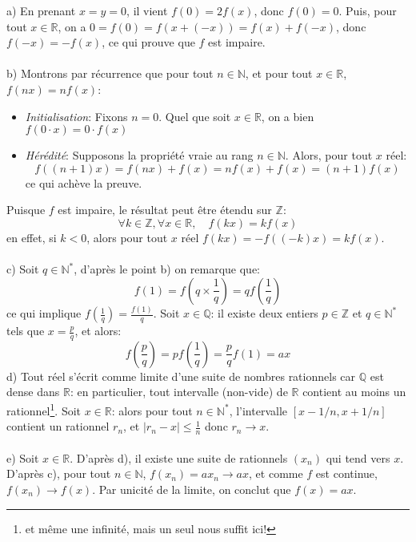 a) En prenant $x=y=0$, il vient $f(0)=2f(x)$, donc $f(0)=0$. Puis, pour tout $x\in\mathbb{R}$, on a $0=f(0)=f(x+(-x))=f(x)+f(-x)$, donc $f(-x)=-f(x)$, ce qui prouve que $f$ est impaire.\\ \\
b) Montrons par récurrence que pour tout $n\in\mathbb{N}$, et pour tout $x\in\mathbb{R}$, $f(nx)=nf(x)$:
\begin{itemize}
  \item \textit{Initialisation}: Fixons $n=0$. Quel que soit $x\in\mathbb{R}$, on a bien $f(0\cdot x)=0\cdot f(x)$
  \item \textit{Hérédité}: Supposons la propriété vraie au rang $n\in\mathbb{N}$. Alors, pour tout $x$ réel:
  \[
  f((n+1)x) = f(nx)+f(x) = nf(x)+f(x) = (n+1)f(x)
  \]
  ce qui achève la preuve.
\end{itemize}
Puisque $f$ est impaire, le résultat peut être étendu sur $\mathbb{Z}$: 
\[ \forall k\in\mathbb{Z}, \forall x \in \mathbb{R}, \quad f(kx)=kf(x) \]
en effet, si $k<0$, alors pour tout $x$ réel $f(kx)=-f((-k)x)=kf(x)$.\\ \\
c) Soit $q\in\mathbb{N}^*$, d’après le point b) on remarque que: 
  \[ f\left( 1 \right) = f\left( q \times \frac{1}{q} \right) = qf\left(\frac{1}{q}\right) \]
ce qui implique $f\left(\frac{1}{q}\right) = \frac{f(1)}{q}$. Soit $x\in\mathbb{Q}$: il existe deux entiers $p\in\mathbb{Z}$ et $q\in\mathbb{N}^*$ tels que $x=\frac{p}{q}$, et alors:
\[
f\left(\frac{p}{q}\right) = pf\left(\frac{1}{q}\right) = \frac{p}{q}f(1) = ax
\]
d) Tout réel s’écrit comme limite d'une suite de nombres rationnels car $\mathbb{Q}$ est dense dans $\mathbb{R}$: en particulier, tout intervalle (non-vide) de $\mathbb{R}$ contient au moins un rationnel\footnote{et même une infinité, mais un seul nous suffit ici!}. Soit $x\in\mathbb{R}$: alors pour tout $n\in\mathbb{N}^*$, l'intervalle $[x-1/n, x+1/n]$ contient un rationnel $r_n$, et $|r_n-x|\leq \frac{1}{n}$ donc $r_n\to x$.\\ \\
e) Soit $x\in\mathbb{R}$. D’après d), il existe une suite de rationnels $(x_n)$ qui tend vers $x$. D’après c), pour tout $n\in\mathbb{N}$, $f(x_n)=ax_n\to ax$, et comme $f$ est continue, $f(x_n)\to f(x)$. Par unicité de la limite, on conclut que $f(x)=ax$.
